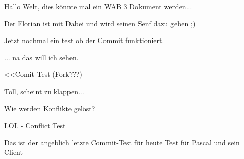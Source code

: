 \documentclass[a4paper,12pt]{scrreprt}
\begin{document}
Hallo Welt, dies könnte mal ein WAB 3 Dokument werden...

Der Florian ist mit Dabei und wird seinen Senf dazu geben ;)

Jetzt nochmal ein test ob der Commit funktioniert.

... na das will ich sehen.


<<Comit Test (Fork???)

Toll, scheint zu klappen...

Wie werden Konflikte gelöst?

LOL - Conflict Test

Das ist der angeblich letzte Commit-Test für heute
Test für Pascal und sein Client
\end{document}
